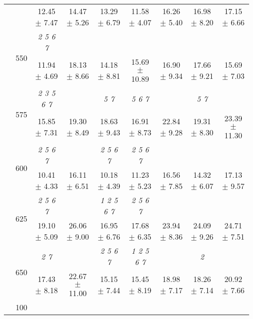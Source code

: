 \begin{table}[h]
{\begin{tabular}{
        ccccccccc}
 & & \cellcolor[HTML]{EFEFEF} 12.45 $\pm$ 7.47& \cellcolor[HTML]{EFEFEF} 14.47 $\pm$ 5.26& \cellcolor[HTML]{EFEFEF} 13.29 $\pm$ 6.79& \cellcolor[HTML]{EFEFEF} 11.58 $\pm$ 4.07& \cellcolor[HTML]{EFEFEF} 16.26 $\pm$ 5.40& \cellcolor[HTML]{EFEFEF} 16.98 $\pm$ 8.20& \cellcolor[HTML]{EFEFEF} 17.15 $\pm$ 6.66 \\ 
 & \multirow{2}{*}{550}& \textit{ 2 5 6 7 }& & & & & &  \\ 
 & & 11.94 $\pm$ 4.69& 18.13 $\pm$ 8.66& 14.18 $\pm$ 8.81& 15.69 $\pm$ 10.89& 16.90 $\pm$ 9.34& 17.66 $\pm$ 9.21& 15.69 $\pm$ 7.03 \\ 
 & \multirow{2}{*}{575}& \cellcolor[HTML]{EFEFEF} \textit{ 2 3 5 6 7 }& \cellcolor[HTML]{EFEFEF} & \cellcolor[HTML]{EFEFEF} \textit{ 5 7 }& \cellcolor[HTML]{EFEFEF} \textit{ 5 6 7 }& \cellcolor[HTML]{EFEFEF} & \cellcolor[HTML]{EFEFEF} \textit{ 5 7 }& \cellcolor[HTML]{EFEFEF}  \\ 
 & & \cellcolor[HTML]{EFEFEF} 15.85 $\pm$ 7.31& \cellcolor[HTML]{EFEFEF} 19.30 $\pm$ 8.49& \cellcolor[HTML]{EFEFEF} 18.63 $\pm$ 9.43& \cellcolor[HTML]{EFEFEF} 16.91 $\pm$ 8.73& \cellcolor[HTML]{EFEFEF} 22.84 $\pm$ 9.28& \cellcolor[HTML]{EFEFEF} 19.31 $\pm$ 8.30& \cellcolor[HTML]{EFEFEF} 23.39 $\pm$ 11.30 \\ 
 & \multirow{2}{*}{600}& \textit{ 2 5 6 7 }& & \textit{ 2 5 6 7 }& \textit{ 2 5 6 7 }& & &  \\ 
 & & 10.41 $\pm$ 4.33& 16.11 $\pm$ 6.51& 10.18 $\pm$ 4.39& 11.23 $\pm$ 5.23& 16.56 $\pm$ 7.85& 14.32 $\pm$ 6.07& 17.13 $\pm$ 9.57 \\ 
 & \multirow{2}{*}{625}& \cellcolor[HTML]{EFEFEF} \textit{ 2 5 6 7 }& \cellcolor[HTML]{EFEFEF} & \cellcolor[HTML]{EFEFEF} \textit{ 1 2 5 6 7 }& \cellcolor[HTML]{EFEFEF} \textit{ 2 5 6 7 }& \cellcolor[HTML]{EFEFEF} & \cellcolor[HTML]{EFEFEF} & \cellcolor[HTML]{EFEFEF}  \\ 
 & & \cellcolor[HTML]{EFEFEF} 19.10 $\pm$ 5.09& \cellcolor[HTML]{EFEFEF} 26.06 $\pm$ 9.00& \cellcolor[HTML]{EFEFEF} 16.95 $\pm$ 6.76& \cellcolor[HTML]{EFEFEF} 17.68 $\pm$ 6.35& \cellcolor[HTML]{EFEFEF} 23.94 $\pm$ 8.36& \cellcolor[HTML]{EFEFEF} 24.09 $\pm$ 9.26& \cellcolor[HTML]{EFEFEF} 24.71 $\pm$ 7.51 \\ 
 & \multirow{2}{*}{650}& \textit{ 2 7 }& & \textit{ 2 5 6 7 }& \textit{ 1 2 5 6 7 }& & \textit{ 2 }&  \\ 
 & & 17.43 $\pm$ 8.18& 22.67 $\pm$ 11.00& 15.15 $\pm$ 7.44& 15.45 $\pm$ 8.19& 18.98 $\pm$ 7.17& 18.26 $\pm$ 7.14& 20.92 $\pm$ 7.66 \\ \midrule 
 & \multirow{2}{*}{100}& & & & & & &  \\ 

\end{tabular}}
\end{table}

